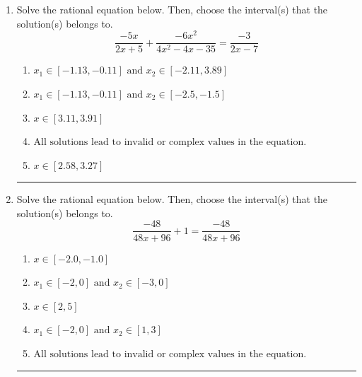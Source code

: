 \documentclass[14pt]{extbook}
\newcommand{\litem}[1]{\item#1\hspace*{-1cm}\rule{\textwidth}{0.4pt}}
\begin{document}
\begin{enumerate}
{\begin{enumerate}[label=\Alph*.]
\end{enumerate} }
\litem{
Solve the rational equation below. Then, choose the interval(s) that the solution(s) belongs to.\[ \frac{-5x}{2x + 5} + \frac{-6x^{2}}{4x^{2} -4 x -35} = \frac{-3}{2x -7} \]\begin{enumerate}[label=\Alph*.]
\item \( x_1 \in [-1.13, -0.11] \text{ and } x_2 \in [-2.11,3.89] \)
\item \( x_1 \in [-1.13, -0.11] \text{ and } x_2 \in [-2.5,-1.5] \)
\item \( x \in [3.11,3.91] \)
\item \( \text{All solutions lead to invalid or complex values in the equation.} \)
\item \( x \in [2.58,3.27] \)

\end{enumerate} }
\litem{
Solve the rational equation below. Then, choose the interval(s) that the solution(s) belongs to.\[ \frac{-48}{48x + 96} + 1 = \frac{-48}{48x + 96} \]\begin{enumerate}[label=\Alph*.]
\item \( x \in [-2.0,-1.0] \)
\item \( x_1 \in [-2, 0] \text{ and } x_2 \in [-3,0] \)
\item \( x \in [2,5] \)
\item \( x_1 \in [-2, 0] \text{ and } x_2 \in [1,3] \)
\item \( \text{All solutions lead to invalid or complex values in the equation.} \)


\end{enumerate}}
\end{enumerate}
\end{document}
